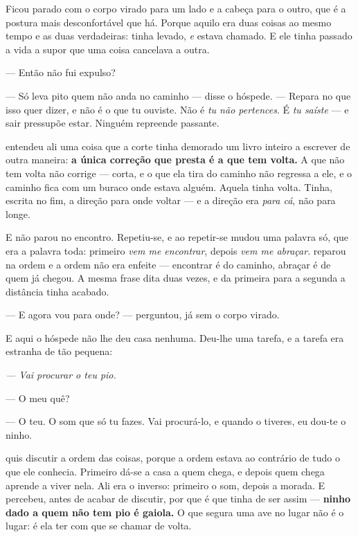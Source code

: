 \documentclass[livro.tex]{subfiles}
\begin{document}
\noindent Ficou parado com o corpo virado para um lado e a cabeça para o outro,
que é a postura mais desconfortável que há. Porque aquilo era duas coisas ao
mesmo tempo e as duas verdadeiras: tinha levado, \emph{e} estava chamado. E ele
tinha passado a vida a supor que uma coisa cancelava a outra.

\medskip
\noindent --- Então não fui expulso?

--- Só leva pito quem não anda no caminho --- disse o hóspede. --- Repara no
que isso quer dizer, e não é o que tu ouviste. Não é \emph{tu não pertences}.
É \emph{tu saíste} --- e sair pressupõe estar. Ninguém repreende passante.

\medskip
\noindent \Ben entendeu ali uma coisa que a corte tinha demorado um livro
inteiro a escrever de outra maneira: \textbf{a única correção que presta é a que
tem volta.} A que não tem volta não corrige --- corta, e o que ela tira do
caminho não regressa a ele, e o caminho fica com um buraco onde estava alguém.
Aquela tinha volta. Tinha, escrita no fim, a direção para onde voltar --- e a
direção era \emph{para cá}, não para longe.

\medskip
\noindent E não parou no encontro. Repetiu-se, e ao repetir-se mudou uma palavra
só, que era a palavra toda: primeiro \emph{vem me encontrar}, depois \emph{vem me
abraçar}. \Ben reparou na ordem e a ordem não era enfeite --- encontrar é do
caminho, abraçar é de quem já chegou. A mesma frase dita duas vezes, e da
primeira para a segunda a distância tinha acabado.

\medskip
\noindent --- E agora vou para onde? --- perguntou, já sem o corpo virado.

E aqui o hóspede não lhe deu casa nenhuma. Deu-lhe uma tarefa, e a tarefa era
estranha de tão pequena:

\begin{center}
\emph{--- Vai procurar o teu pio.}
\end{center}

\medskip
\noindent --- O meu quê?

--- O teu. O som que só tu fazes. Vai procurá-lo, e quando o tiveres, eu dou-te
o ninho.

\medskip
\noindent \Ben quis discutir a ordem das coisas, porque a ordem estava ao
contrário de tudo o que ele conhecia. Primeiro dá-se a casa a quem chega, e
depois quem chega aprende a viver nela. Ali era o inverso: primeiro o som,
depois a morada. E percebeu, antes de acabar de discutir, por que é que tinha de
ser assim --- \textbf{ninho dado a quem não tem pio é gaiola.} O que segura uma
ave no lugar não é o lugar: é ela ter com que se chamar de volta.
\end{document}
